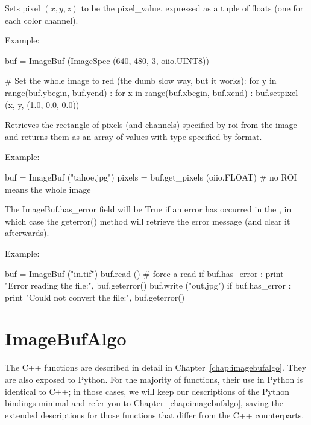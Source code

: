 Sets pixel $(x,y,z)$ to be the {\cf pixel_value}, expressed as a tuple of
{\cf float}s (one for each color channel).

\noindent Example:
\begin{code}
    buf = ImageBuf (ImageSpec (640, 480, 3, oiio.UINT8))

    # Set the whole image to red (the dumb slow way, but it works):
    for y in range(buf.ybegin, buf.yend) :
        for x in range(buf.xbegin, buf.xend) :
            buf.setpixel (x, y, (1.0, 0.0, 0.0))
\end{code}
\apiend


Retrieves the rectangle of pixels (and channels) specified by {\cf roi} from
the image and returns them as an array of values with type specified by
{\cf format}.

\noindent Example:
\begin{code}
    buf = ImageBuf ("tahoe.jpg")
    pixels = buf.get_pixels (oiio.FLOAT)  # no ROI means the whole image
\end{code}
\apiend

The {\cf ImageBuf.has_error} field will be {\cf True} if an error has
occurred in the \ImageBuf, in which case the {\cf geterror()} method will
retrieve the error message (and clear it afterwards).

\noindent Example:
\begin{code}
    buf = ImageBuf ("in.tif")
    buf.read ()   # force a read
    if buf.has_error :
        print "Error reading the file:", buf.geterror()
    buf.write ("out.jpg")
    if buf.has_error :
        print "Could not convert the file:", buf.geterror()
\end{code}
\apiend


\newpage
\section{ImageBufAlgo}
\label{sec:pythonimagebufalgo}

The C++ \IBA functions are described in detail in
Chapter~\ref{chap:imagebufalgo}.  They are also exposed to Python.
For the majority of \IBA functions, their use in Python is identical
to C++; in those cases, we will keep our descriptions of the Python
bindings minimal and refer you to Chapter~\ref{chap:imagebufalgo}, saving
the extended descriptions for those functions that differ from the C++
counterparts.

